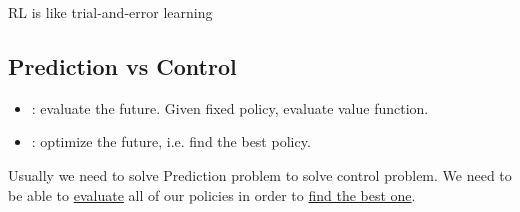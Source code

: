 RL is like trial-and-error learning 

\subsection{Prediction vs Control}
\begin{itemize}
	\item {}: evaluate the future. Given fixed policy, evaluate value function.
	\item {}: optimize the future, i.e. find the best policy.
\end{itemize}

Usually we need to solve Prediction problem to solve control problem. We need to be able to \underline{evaluate} all of our policies in order to \underline{find the best one}.
